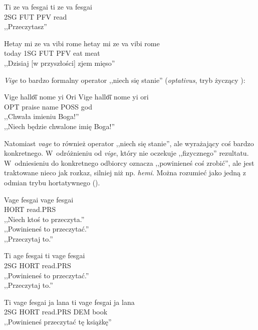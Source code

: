 \begin{spacing}{1.1}
\begin{exe}
	\ex
	\trans Ti ze va fesgai
	\gll  ti ze va fesgai\\
	  2SG FUT PFV read \\
	\glt  ,,Przeczytasz''
\end{exe}

\begin{exe}
	\ex
	\trans Hetay mi ze va vibi rome
	\gll hetay mi ze va vibi rome\\
		today 1SG FUT PFV eat meat \\
	\glt  ,,Dzisiaj [w przyszłości] zjem mięso''
\end{exe}

\emph{Vige} to bardzo formalny operator ,,niech się stanie'' (\emph{optativus},
tryb życzący \Opt{}):

\begin{exe}
	\ex
	\trans Vige hallo͞i nome yi Ori
	\gll  Vige hallo͞i nome yi ori \\
	  OPT praise name POSS god \\
	\glt  ,,Chwała imieniu Boga!'' \\ ,,Niech będzie chwalone imię Boga!''
\end{exe}

Natomiast \emph{vage} to również operator ,,niech się stanie'', ale wyrażający
coś bardzo konkretnego. W~odróżnieniu od \emph{vige}, który nie
oczekuje ,,fizycznego'' rezultatu. W~odniesieniu do konkretnego odbiorcy
oznacza ,,powinieneś coś zrobić'', ale jest traktowane nieco jak rozkaz,
silniej niż np. \emph{hemi}. Można rozumieć jako jedną z odmian trybu
hortatywnego (\Hort{}).

\begin{exe}
	\ex
	\trans Vage fesgai
	\gll  vage fesgai\\
	  HORT read.PRS\\
	\glt  ,,Niech ktoś to przeczyta.'' \\ ,,Powinieneś to przeczytać.'' \\ ,,Przeczytaj to.''
\end{exe}

\begin{exe}
	\ex
	\trans Ti age fesgai
	\gll  ti vage fesgai\\
	  2SG HORT read.PRS\\
	\glt ,,Powinieneś to przeczytać.'' \\ ,,Przeczytaj to.''
\end{exe}

\begin{exe}
	\ex
	\trans Ti vage fesgai ja lana
	\gll  ti vage fesgai ja lana\\
	  2SG HORT read.PRS DEM book\\
	\glt  ,,Powinieneś przeczytać tę książkę''
\end{exe}


\end{spacing}
